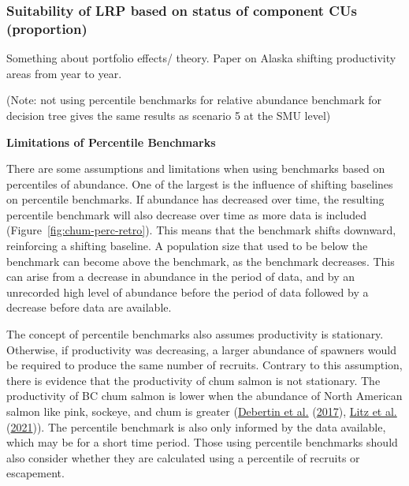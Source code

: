 \documentclass[11pt]{book}
\begin{document}
\hypertarget{suitability-of-lrp-based-on-status-of-component-cus-proportion}{%
\subsubsection{Suitability of LRP based on status of component CUs (proportion)}\label{suitability-of-lrp-based-on-status-of-component-cus-proportion}}

Something about portfolio effects/ theory. Paper on Alaska shifting productivity areas from year to year.

(Note: not using percentile benchmarks for relative abundance benchmark for decision tree gives the same results as scenario 5 at the SMU level)

\textbf{Limitations of Percentile Benchmarks}

There are some assumptions and limitations when using benchmarks based on percentiles of abundance. One of the largest is the influence of shifting baselines on percentile benchmarks. If abundance has decreased over time, the resulting percentile benchmark will also decrease over time as more data is included (Figure~\ref{fig:chum-perc-retro}). This means that the benchmark shifts downward, reinforcing a shifting baseline. A population size that used to be below the benchmark can become above the benchmark, as the benchmark decreases. This can arise from a decrease in abundance in the period of data, and by an unrecorded high level of abundance before the period of data followed by a decrease before data are available.

The concept of percentile benchmarks also assumes productivity is stationary. Otherwise, if productivity was decreasing, a larger abundance of spawners would be required to produce the same number of recruits. Contrary to this assumption, there is evidence that the productivity of chum salmon is not stationary. The productivity of BC chum salmon is lower when the abundance of North American salmon like pink, sockeye, and chum is greater (\protect\hyperlink{ref-debertinMarineGrowthPatterns2017}{Debertin et al.} (\protect\hyperlink{ref-debertinMarineGrowthPatterns2017}{2017}), \protect\hyperlink{ref-litzCompetitionOddyearPink2021}{Litz et al.} (\protect\hyperlink{ref-litzCompetitionOddyearPink2021}{2021})). The percentile benchmark is also only informed by the data available, which may be for a short time period. Those using percentile benchmarks should also consider whether they are calculated using a percentile of recruits or escapement.
\end{document}
